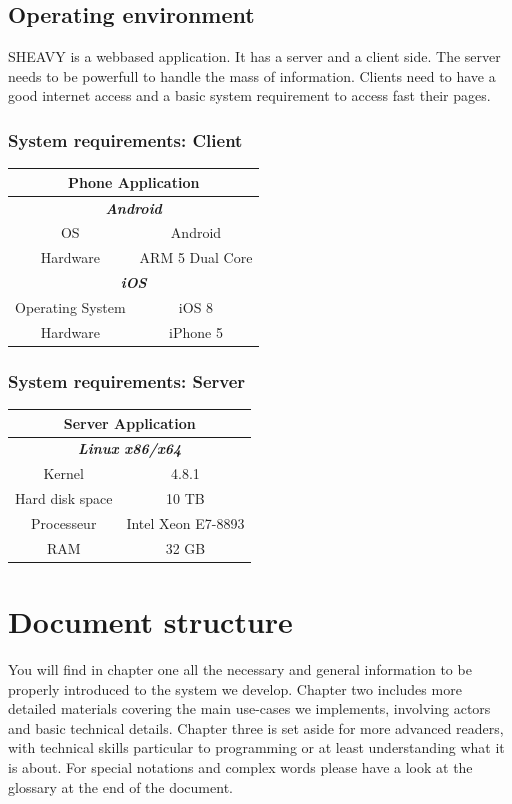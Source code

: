 \subsection{Operating environment}
SHEAVY is a webbased application. It has a server and a client side. The server
needs to be powerfull to handle the mass of information. Clients need to have a
good internet access and a basic system requirement to access fast their
pages.\\

\subsubsection{System requirements: Client}
\begin{tabular}{|c|c|}
\hline
\multicolumn{2}{|c|}{\textbf{Phone Application}} \\
\hline
\multicolumn{2}{|c|}{\textit{\textbf{Android}}} \\
\hline
OS & Android \\
\hline
Hardware & ARM 5 Dual Core \\
\hline
\multicolumn{2}{|c|}{\textit{\textbf{iOS}}} \\
\hline
Operating System & iOS 8 \\
\hline
Hardware & iPhone 5 \\
\hline
\end{tabular}

\subsubsection{System requirements: Server}
\begin{tabular}{|c|c|}
\hline
\multicolumn{2}{|c|}{\textbf{Server Application}} \\
\hline
\multicolumn{2}{|c|}{\textit{\textbf{Linux x86/x64}}} \\
\hline
Kernel & 4.8.1 \\
\hline
Hard disk space & 10 TB   \\
\hline
Processeur & Intel Xeon E7-8893 \\
\hline
RAM & 32 GB \\
\hline
\end{tabular}

\section{Document structure}  
You will find in chapter one all the necessary and general information to be properly introduced
to the system we develop. Chapter two includes more detailed materials covering the main
use-cases we implements, involving actors and basic technical details. Chapter three is set
aside for more advanced readers, with technical skills particular to programming or at least
understanding what it is about.
For special notations and complex words please have a look at the glossary at the end of the
document.\\






